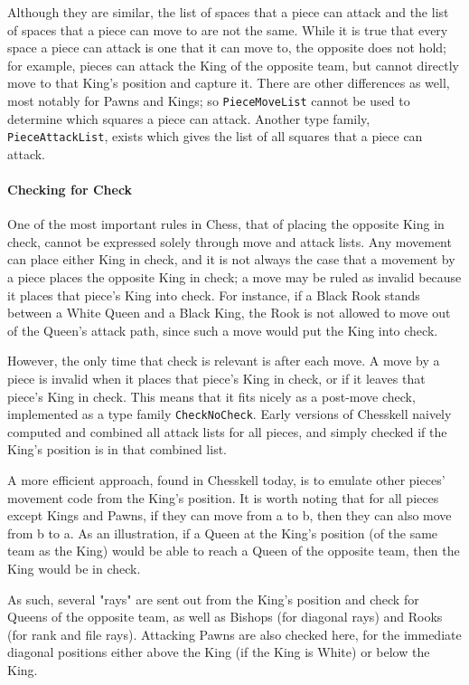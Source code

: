 \documentclass[12pt, a4paper, bibliography=totocnumbered]{scrreprt}
\newcommand{\inline}[1]{\lstinline[basicstyle=\ttfamily\footnotesize]{#1}}
\begin{document}
Although they are similar, the list of spaces that a piece can attack and the list of spaces that a piece can move to are not the same. While it is true that every space a piece can attack is one that it can move to, the opposite does not hold; for example, pieces can attack the King of the opposite team, but cannot directly move to that King's position and capture it. There are other differences as well, most notably for Pawns and Kings; so \inline{PieceMoveList} cannot be used to determine which squares a piece can attack. Another type family, \inline{PieceAttackList}, exists which gives the list of all squares that a piece can attack.

\paragraph{Checking for Check}

One of the most important rules in Chess, that of placing the opposite King in check, cannot be expressed solely through move and attack lists. Any movement can place either King in check, and it is not always the case that a movement by a piece places the opposite King in check; a move may be ruled as invalid because it places that piece's King into check. For instance, if a Black Rook stands between a White Queen and a Black King, the Rook is not allowed to move out of the Queen's attack path, since such a move would put the King into check.

However, the only time that check is relevant is after each move. A move by a piece is invalid when it places that piece's King in check, or if it leaves that piece's King in check. This means that it fits nicely as a post-move check, implemented as a type family \inline{CheckNoCheck}. Early versions of Chesskell naively computed and combined all attack lists for all pieces, and simply checked if the King's position is in that combined list.

A more efficient approach, found in Chesskell today, is to emulate other pieces' movement code from the King's position. It is worth noting that for all pieces except Kings and Pawns, if they can move from a to b, then they can also move from b to a. As an illustration, if a Queen at the King's position (of the same team as the King) would be able to reach a Queen of the opposite team, then the King would be in check.

As such, several "rays" are sent out from the King's position and check for Queens of the opposite team, as well as Bishops (for diagonal rays) and Rooks (for rank and file rays). Attacking Pawns are also checked here, for the immediate diagonal positions either above the King (if the King is White) or below the King.
\end{document}
